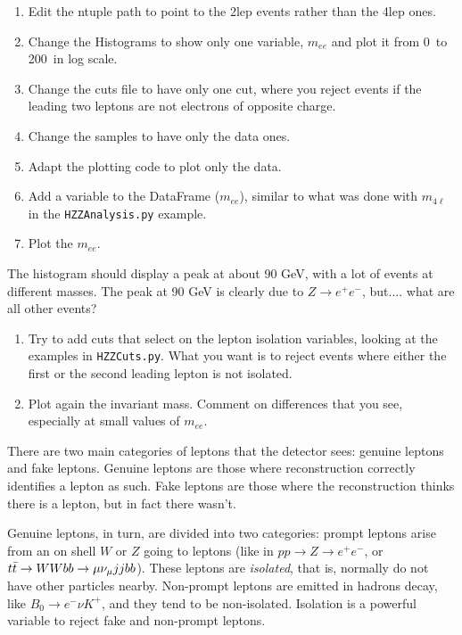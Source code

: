 \begin{enumerate} 
\item Edit the ntuple path to point to the 2lep events rather than the 4lep ones. 
\item Change the Histograms to show only one variable, $m_{ee}$ and plot it from 0\ \GeV to 200\ \GeV in log scale. 
\item Change the cuts file to have only one cut, where you reject events if the leading two leptons are not electrons of opposite charge. 
\item Change the samples to have only the data ones. 
\item Adapt the plotting code to plot only the data. 
\item Add a variable to the DataFrame ($m_{ee}$), similar to what was done with $m_{4\ell}$ in the \verb|HZZAnalysis.py| example.
\item Plot the $m_{ee}$. 
\end{enumerate}

\begin{remark}
The histogram should display a peak at about 90 GeV, with a lot of events at different masses. The peak at 90 GeV is clearly due to $Z\rightarrow e^+ e^-$, but.... what are all other events?
\end{remark}

\begin{enumerate} [resume]
\item  Try to add cuts that select on the lepton isolation variables, looking at the examples in  \verb|HZZCuts.py|. What you want is to reject events where either the first or the second leading lepton is not isolated. 
\item Plot again the invariant mass. Comment on differences that you see, especially at small values of $m_{ee}$. 
\end{enumerate}

\begin{remark}
There are two main categories of leptons that the detector sees: genuine leptons and fake leptons. Genuine leptons are those where reconstruction correctly identifies a lepton as such. Fake leptons are those where the reconstruction thinks there is a lepton, but in fact there wasn't. 

Genuine leptons, in turn, are divided into two categories: prompt leptons arise from an on shell $W$ or $Z$ going to leptons (like in $pp\rightarrow Z\rightarrow e^+ e^-$, or $t\bar{t} \rightarrow WWbb \rightarrow \mu \nu_{\mu} jjbb$). These leptons are \textit{isolated}, that is, normally do not have other particles nearby. Non-prompt leptons are emitted in hadrons decay, like $B_0\rightarrow e^-\nu K^+$, and they tend to be non-isolated. Isolation is a powerful variable to reject fake and non-prompt leptons.   
\end{remark}

